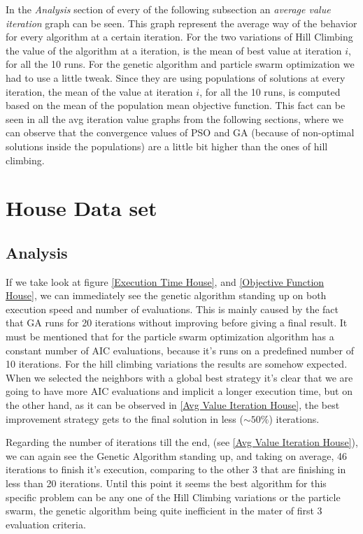 In the \textit{Analysis} section of every of the following subsection an \textit{average value iteration} graph can be seen. This graph represent the average way of the behavior for every algorithm at a certain iteration. For the two variations of Hill Climbing the value of the algorithm at a iteration, is the mean of best value at iteration $i$, for all the 10 runs. For the genetic algorithm and particle swarm optimization we had to use a little tweak. Since they are using populations of solutions at every iteration, the mean of the value at iteration $i$, for all the 10 runs, is computed based on the mean of the population mean objective function. This fact can be seen in all the avg iteration value graphs from the following sections, where we can observe that the convergence values of PSO and GA (because of non-optimal solutions inside the populations) are a little bit higher than the ones of hill climbing.

\section{House Data set}
\label{house results}
\subsection{Analysis}
If we take look at figure \ref{Execution Time House}, and \ref{Objective Function House}, we can immediately see the genetic algorithm standing up on both execution speed and number of evaluations. This is mainly caused by the fact that GA runs for 20 iterations without improving before giving a final result. It must be mentioned that for the particle swarm optimization algorithm has a constant number of AIC evaluations, because it's runs on a predefined number of 10 iterations. For the hill climbing variations the results are somehow expected. When we selected the neighbors with a global best strategy it's clear that we are going to have more AIC evaluations and implicit a longer execution time, but on the other hand, as it can be observed in \ref{Avg Value Iteration House},  the best improvement strategy gets to the final solution in less ($ \sim 50\%$) iterations.

 Regarding the number of iterations till the end, (see \ref{Avg Value Iteration House}), we can again see the Genetic Algorithm standing up, and taking on average, 46 iterations to finish it's execution, comparing to the other 3 that are finishing in less than 20 iterations. Until this point it seems the best algorithm for this specific problem can be any one of the Hill Climbing variations or the particle swarm, the genetic algorithm being quite inefficient in the mater of first 3 evaluation criteria.
 
